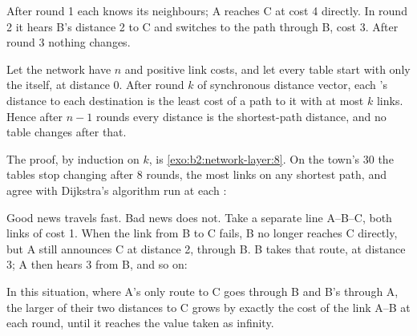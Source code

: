 \label{out:b2:network-layer:dv}

After round 1 each  knows its neighbours; A reaches C at cost 4 directly. In round 2 it hears B's distance 2
to C and switches to the path through B, cost 3. After round 3 nothing changes.

\begin{theorem}[Convergence]\label{thm:b2:network-layer:dv-converge}
Let the network have $n$  and positive link costs, and let every table start with only the  itself, at
distance 0. After round $k$ of synchronous distance vector, each 's distance to each destination is the least
cost of a path to it with at most $k$ links. Hence after $n - 1$ rounds every distance is the shortest-path distance,
and no table changes after that.
\end{theorem}

The proof, by induction on $k$, is \cref{exo:b2:network-layer:8}. On the town's 30  the tables stop changing
after 8 rounds, the most links on any shortest path, and agree with Dijkstra's algorithm run at each :


Good news travels fast. Bad news does not. Take a separate line A--B--C, both links of cost 1. When the link from B to C fails, B no longer reaches C
directly, but A still announces C at distance 2, through B. B takes that route, at distance 3; A then hears 3 from
B, and so on:


\begin{proposition}\label{prop:b2:network-layer:count-to-infinity}
In this situation, where A's only route to C goes through B and B's through A, the larger of their two distances to C
grows by exactly the cost of the link A--B at each round, until it reaches the value taken as infinity.
\end{proposition}

